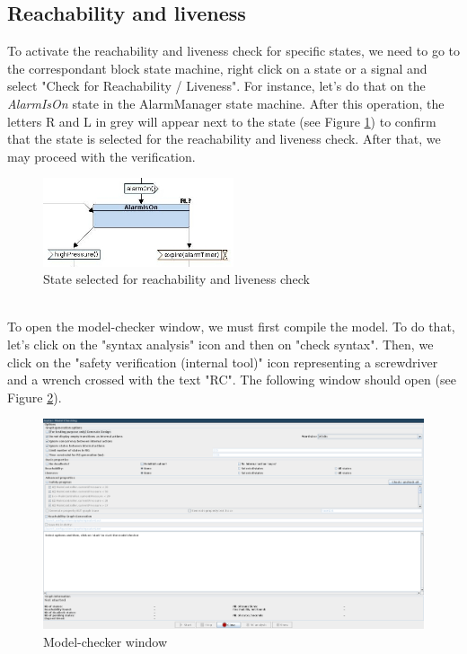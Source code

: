 \documentclass[12pt]{article}
\begin{document}
\subsection{Reachability and liveness}
To activate the reachability and liveness check for specific states, we need to go to the correspondant block state machine, right click on a state or a signal and select "Check for Reachability / Liveness". For instance, let's do that on the \textit{AlarmIsOn} state in the AlarmManager state machine. After this operation, the letters R and L in grey will appear next to the state (see Figure \ref{fig:rl_grey}) to confirm that the state is selected for the reachability and liveness check. After that, we may proceed with the verification.
\begin{figure}[h!]
\centering
\includegraphics[width=0.5\textwidth]{images/rl_grey.jpg}
\caption{State selected for reachability and liveness check}
\label{fig:rl_grey}
\end{figure}
\\To open the model-checker window, we must first compile the model. To do that, let's click on the "syntax analysis" icon and then on "check syntax". Then, we click on the "safety verification (internal tool)" icon representing a screwdriver and a wrench crossed with the text "RC". The following window should open (see Figure \ref{fig:mcwindow}).
\begin{figure}[h!]
\centering
\includegraphics[width=\textwidth]{images/modelcheckerwindow.png}
\caption{Model-checker window}
\label{fig:mcwindow}
\end{figure}
\end{document}
